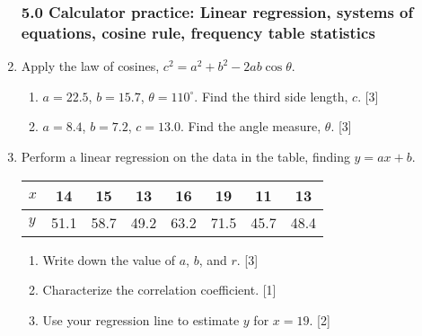\documentclass[12pt, twoside]{article}
\begin{document}
\begin{enumerate}
    \subsubsection*{5.0 Calculator practice: Linear regression, systems of equations, cosine rule, frequency table statistics}

    \item Apply the law of cosines, $c^2=a^2+b^2-2ab \cos \theta$.
    \begin{enumerate}
        \item $a=22.5$, $b=15.7$, $\theta = 110^\circ$. Find the third side length, $c$. \hfill [3]
        \item $a=8.4$, $b=7.2$, $c=13.0$. Find the angle measure, $\theta$. \hfill [3]
    \end{enumerate}

    \item Perform a linear regression on the data in the table, finding $y=ax+b$. 
            \begin{center}
            \begin{tabular}{|l|c|c|c|c|c|c|c|}
                \hline
                $x$ & 14 & 15 & 13 & 16 & 19 & 11 & 13 \\ 
                \hline 
                $y$ & 51.1 & 58.7 & 49.2 & 63.2 & 71.5 & 45.7 & 48.4 \\ 
                \hline 
                \end{tabular}
            \end{center}
            \begin{enumerate}
                \item Write down the value of $a$, $b$, and $r$. \hfill [3]
                \item Characterize the correlation coefficient. \hfill [1]
                \item Use your regression line to estimate $y$ for $x=19$. \hfill [2]
            \end{enumerate}
        

\end{enumerate}
\end{document}
